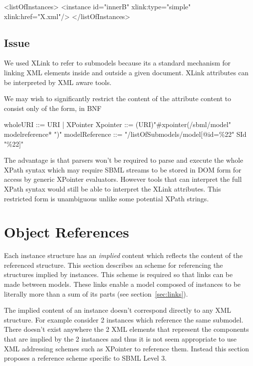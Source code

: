 \documentclass{cekarticle}
\begin{document}
\begin{example}
<listOfInstances>
    <instance
        id="innerB"
        xlink:type="simple"
        xlink:href="X.xml"/>
</listOfInstances>
\end{example}

\subsection{Issue}

We used XLink to refer to submodels because its a standard mechanism for linking
XML elements inside and outside a given document.  XLink attributes can be interpreted
by XML aware tools.

We may wish to significantly restrict the content of the  attribute content to consist only of the form, in BNF

\begin{example}
   wholeURI ::= URI | XPointer
   Xpointer ::= (URI)"#xpointer(/sbml/model" modelreference* ")"
   modelReference ::= "/listOfSubmodels/model[@id=\%22" SId "\%22]" 
\end{example}

The advantage is that parsers won't be required to parse and execute the whole XPath syntax which may require SBML streams
to be stored in DOM form for access by generic XPointer evaluators.  However tools that can interpret the full XPath syntax would
still be able to interpret the XLink attributes.
This restricted form is unambiguous unlike some potential XPath strings.

\section{Object References}
\label{sec:objectreferences}

Each instance structure has an \emph{implied} content which reflects the content of the referenced  structure.
This section describes an scheme for referencing the structures implied by instances.
This scheme is required so that links can be made between models.  These links enable a model composed of instances to be literally more
than a sum of its parts (see section~\ref{sec:links}).

The implied content of an instance doesn't correspond directly to any XML structure.  For example consider 2 instances which reference
the same submodel.  There doesn't exist anywhere the 2 XML elements that
represent the components that are implied by the 2 instances and thus it is not seem appropriate to use XML addressing schemes such as
XPointer to reference them.  Instead this section proposes a reference scheme
specific to SBML Level 3.
\end{document}
